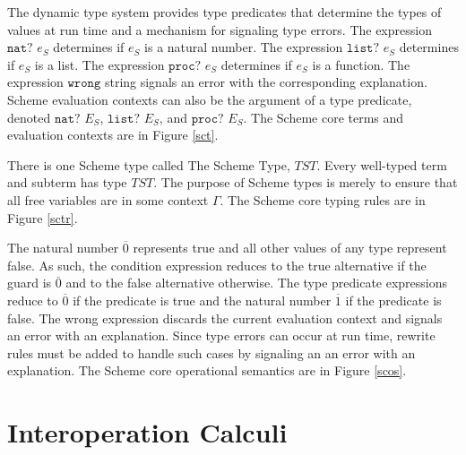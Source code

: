 The dynamic type system provides type predicates that determine the types of values at run time and a mechanism for signaling type errors.  The expression $\mathtt{nat?}$ $e_{S}$ determines if $e_{S}$ is a natural number.  The expression $\mathtt{list?}$ $e_{S}$ determines if $e_{S}$ is a list.  The expression $\mathtt{proc?}$ $e_{S}$ determines if $e_{S}$ is a function.  The expression $\mathtt{wrong}$ string signals an error with the corresponding explanation.  Scheme evaluation contexts can also be the argument of a type predicate, denoted $\mathtt{nat?}$ $E_{S}$, $\mathtt{list?}$ $E_{S}$, and $\mathtt{proc?}$ $E_{S}$.  The Scheme core terms and evaluation contexts are in Figure \ref{sct}.

There is one Scheme type called The Scheme Type, $TST$.  Every well-typed term and subterm has type $TST$.  The purpose of Scheme types is merely to ensure that all free variables are in some context $\Gamma$.  The Scheme core typing rules are in Figure \ref{sctr}.

The natural number $\overline{0}$ represents true and all other values of any type represent false.  As such, the condition expression reduces to the true alternative if the guard is $\overline{0}$ and to the false alternative otherwise.  The type predicate expressions reduce to $\overline{0}$ if the predicate is true and the natural number $\overline{1}$ if the predicate is false.  The wrong expression discards the current evaluation context and signals an error with an explanation.  Since type errors can occur at run time, rewrite rules must be added to handle such cases by signaling an an error with an explanation.  The Scheme core operational semantics are in Figure \ref{scos}.











\section{Interoperation Calculi}

